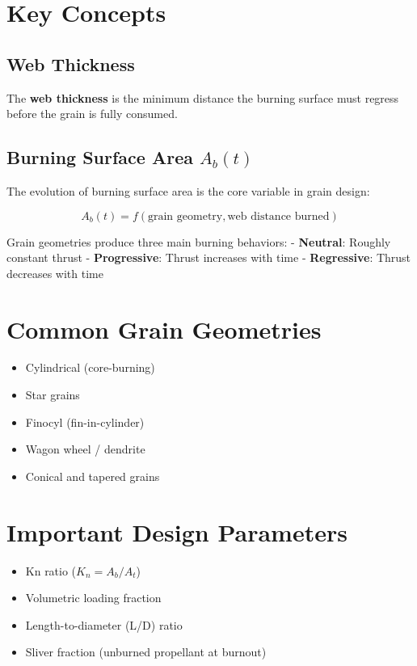 \documentclass[
  letterpaper,
  DIV=11,
  numbers=noendperiod]{scrreprt}
\providecommand{\tightlist}{%
  \setlength{\itemsep}{0pt}\setlength{\parskip}{0pt}}
\begin{document}
\section{Key Concepts}\label{key-concepts}

\subsection{Web Thickness}\label{web-thickness}

The \textbf{web thickness} is the minimum distance the burning surface
must regress before the grain is fully consumed.

\subsection{\texorpdfstring{Burning Surface Area
\(A_b(t)\)}{Burning Surface Area A\_b(t)}}\label{burning-surface-area-a_bt}

The evolution of burning surface area is the core variable in grain
design:

\[
A_b(t) = f(\text{grain geometry}, \text{web distance burned})
\]

Grain geometries produce three main burning behaviors: -
\textbf{Neutral}: Roughly constant thrust - \textbf{Progressive}: Thrust
increases with time - \textbf{Regressive}: Thrust decreases with time

\section{Common Grain Geometries}\label{common-grain-geometries}

\begin{itemize}
\tightlist
\item
  Cylindrical (core-burning)
\item
  Star grains
\item
  Finocyl (fin-in-cylinder)
\item
  Wagon wheel / dendrite
\item
  Conical and tapered grains
\end{itemize}

\section{Important Design Parameters}\label{important-design-parameters}

\begin{itemize}
\tightlist
\item
  Kn ratio (\(K_n = A_b / A_t\))
\item
  Volumetric loading fraction
\item
  Length-to-diameter (L/D) ratio
\item
  Sliver fraction (unburned propellant at burnout)
\end{itemize}
\end{document}
